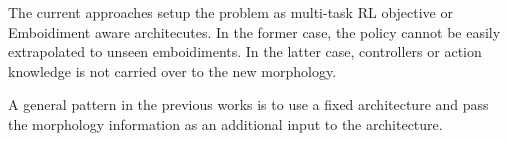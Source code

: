 
The current approaches setup the problem as multi-task RL objective or Emboidiment aware architecutes. 
In the former case, the policy cannot be easily extrapolated to unseen emboidiments. \cite{parakhAnyBodyBenchmarkSuite2025}
In the latter case, controllers or action knowledge is not carried over to the new morphology. \cite{naya-varelaMorphologicalDevelopmentRobotic2021}

A general pattern in the previous works is to use a fixed architecture and pass the morphology information as an additional input to the architecture. \cite{beaussantTransferLearningRobots2023} \cite{hongStructureAwareTransformerPolicy2021} \cite{bohlingerLearningRobotLocomotion}